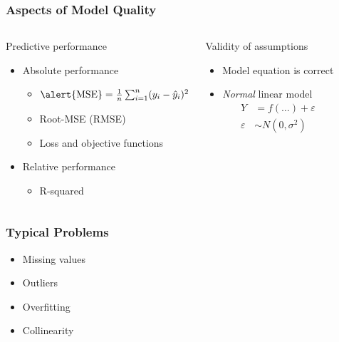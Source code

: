 \documentclass[
    utf8,
    aspectratio=169
]{beamer}  %
\begin{document}
\begin{frame}
\frametitle{Aspects of Model Quality}
\begin{columns}[onlytextwidth]
	\begin{block}{Predictive performance}
		\begin{itemize}
			\item Absolute performance
				\begin{itemize}
					\item $\text{\alert{MSE}} = \frac{1}{n}\sum_{i = 1}^n (y_i - \hat y_i)^2$
					\item Root-MSE (\alert{RMSE})
					\item Loss and objective functions	
				\end{itemize}
			\item Relative performance
				\begin{itemize}
					\item \alert{R-squared}
				\end{itemize}
		\end{itemize}
	\end{block}	

	\begin{block}{Validity of assumptions}
		\begin{itemize}
			\item Model equation is correct
			\item {\em Normal} linear model
			 \begin{align*}
				 Y &= f(\dots) + \varepsilon \\
				 \varepsilon &\sim N(0, \sigma^2)
			 \end{align*}
		\end{itemize}
	\end{block}
\end{columns}
\begin{center}
	\begin{example}
	\end{example}
\end{center}
\end{frame}

\begin{frame}
\frametitle{Typical Problems}
\begin{itemize}
	\item Missing values
	
	\vfill
	
	\item Outliers
	
	\vfill
	
	\item Overfitting
	
	\vfill 
	
	\item Collinearity
\end{itemize}
\end{frame}
\end{document}

